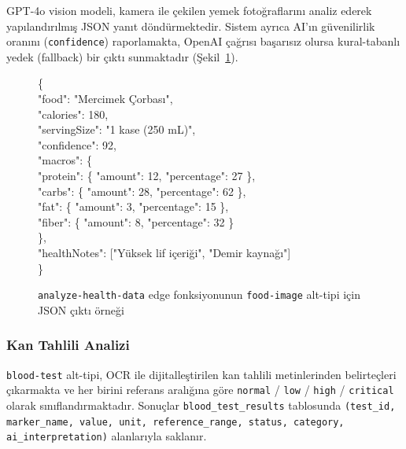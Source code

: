GPT-4o vision modeli, kamera ile çekilen yemek fotoğraflarını analiz ederek yapılandırılmış JSON yanıt döndürmektedir. Sistem ayrıca AI'ın güvenilirlik oranını (\texttt{confidence}) raporlamakta, OpenAI çağrısı başarısız olursa kural-tabanlı yedek (fallback) bir çıktı sunmaktadır (Şekil~\ref{lst:food_json}).

\begin{figure}[H]
\centering
\begin{minipage}{0.85\textwidth}
\small\ttfamily
\noindent\{ \\
\hspace*{1em}"food": "Mercimek Çorbası", \\
\hspace*{1em}"calories": 180, \\
\hspace*{1em}"servingSize": "1 kase (250 mL)", \\
\hspace*{1em}"confidence": 92, \\
\hspace*{1em}"macros": \{ \\
\hspace*{2em}"protein": \{ "amount": 12, "percentage": 27 \}, \\
\hspace*{2em}"carbs":   \{ "amount": 28, "percentage": 62 \}, \\
\hspace*{2em}"fat":     \{ "amount":  3, "percentage": 15 \}, \\
\hspace*{2em}"fiber":   \{ "amount":  8, "percentage": 32 \} \\
\hspace*{1em}\}, \\
\hspace*{1em}"healthNotes": ["Yüksek lif içeriği", "Demir kaynağı"] \\
\}
\end{minipage}
\caption{\texttt{analyze-health-data} edge fonksiyonunun \texttt{food-image} alt-tipi için JSON çıktı örneği}
\label{lst:food_json}
\end{figure}

\subsubsection{Kan Tahlili Analizi}

\texttt{blood-test} alt-tipi, OCR ile dijitalleştirilen kan tahlili metinlerinden belirteçleri çıkarmakta ve her birini referans aralığına göre \texttt{normal} / \texttt{low} / \texttt{high} / \texttt{critical} olarak sınıflandırmaktadır. Sonuçlar \texttt{blood\_test\_results} tablosunda \texttt{(test\_id, marker\_name, value, unit, reference\_range, status, category, ai\_interpretation)} alanlarıyla saklanır.

